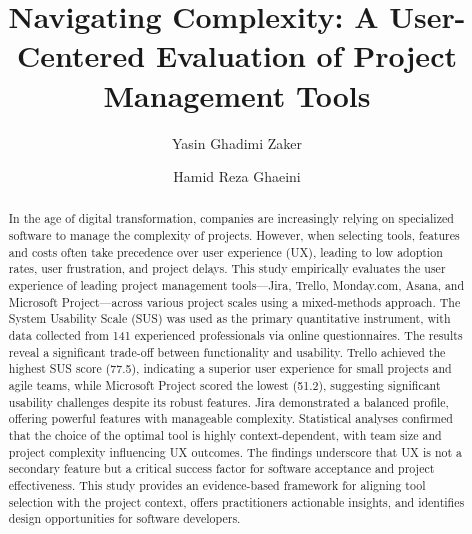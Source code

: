 \documentclass[runningheads]{llncs}
\begin{document}
\title{Navigating Complexity: A User-Centered Evaluation of Project Management Tools}


\author{Yasin Ghadimi Zaker
\and
Hamid Reza Ghaeini}



\maketitle

\begin{abstract}
In the age of digital transformation, companies are increasingly relying on specialized software to manage the complexity of projects. However, when selecting tools, features and costs often take precedence over user experience (UX), leading to low adoption rates, user frustration, and project delays. This study empirically evaluates the user experience of leading project management tools—Jira, Trello, Monday.com, Asana, and Microsoft Project—across various project scales using a mixed-methods approach. The System Usability Scale (SUS) was used as the primary quantitative instrument, with data collected from 141 experienced professionals via online questionnaires. The results reveal a significant trade-off between functionality and usability. Trello achieved the highest SUS score (77.5), indicating a superior user experience for small projects and agile teams, while Microsoft Project scored the lowest (51.2), suggesting significant usability challenges despite its robust features. Jira demonstrated a balanced profile, offering powerful features with manageable complexity. Statistical analyses confirmed that the choice of the optimal tool is highly context-dependent, with team size and project complexity influencing UX outcomes. The findings underscore that UX is not a secondary feature but a critical success factor for software acceptance and project effectiveness. This study provides an evidence-based framework for aligning tool selection with the project context, offers practitioners actionable insights, and identifies design opportunities for software developers.

\end{abstract}
\end{document}
